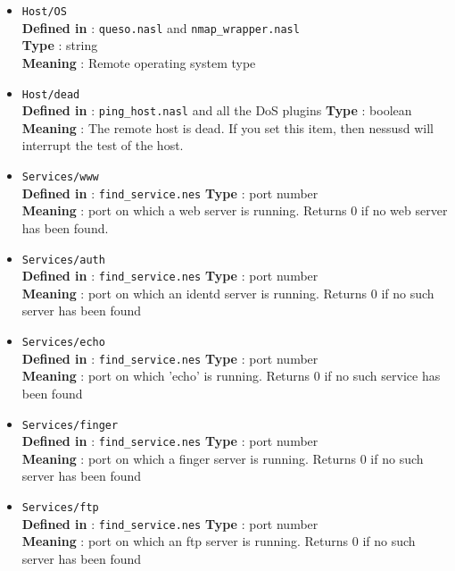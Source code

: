 \documentclass{article}
\begin{document}
\begin{itemize}
\item \verb+Host/OS+\\
\textbf{Defined in} : \verb+queso.nasl+ and \verb+nmap_wrapper.nasl+\\
\textbf{Type} : string\\
\textbf{Meaning} : Remote operating system type

\item \verb+Host/dead+\\
\textbf{Defined in} : \verb+ping_host.nasl+ and all the DoS plugins 
\textbf{Type} : boolean\\
\textbf{Meaning} : The remote host is dead. If you set this item, then nessusd
will interrupt the test of the host.

\item \verb+Services/www+\\
\textbf{Defined in} : \verb+find_service.nes+
\textbf{Type} : port number\\
\textbf{Meaning} : port on which a web server is running. Returns 0 if no web
server has been found.


\item \verb+Services/auth+\\
\textbf{Defined in} : \verb+find_service.nes+
\textbf{Type} : port number\\
\textbf{Meaning} : port on which an identd server is running. Returns 0 if no
such server has been found

\item \verb+Services/echo+\\
\textbf{Defined in} : \verb+find_service.nes+
\textbf{Type} : port number\\
\textbf{Meaning} : port on which 'echo' is running. Returns 0 if no
such service has been found


\item \verb+Services/finger+\\
\textbf{Defined in} : \verb+find_service.nes+
\textbf{Type} : port number\\
\textbf{Meaning} : port on which a finger server is running. Returns 0 if no
such server has been found

\item \verb+Services/ftp+\\
\textbf{Defined in} : \verb+find_service.nes+
\textbf{Type} : port number\\
\textbf{Meaning} : port on which an ftp server is running. Returns 0 if no
such server has been found


\end{itemize}
\end{document}
